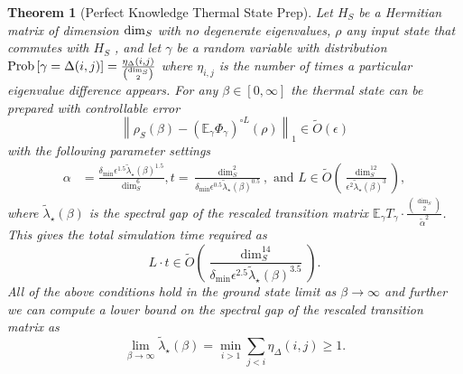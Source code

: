 \documentclass[
 amsmath,amssymb,
 aps,
onecolumn, 
nofootinbib]{revtex4-2}
\newtheorem{theorem}{Theorem}
\newcommand{\norm}[1]{\left\| #1 \right\|}
\newcommand{\EE}{\mathbb{E}}
\newcommand{\prob}[1]{{\rm Prob}\left[ #1 \right]}
\newcommand{\bigotilde}[1]{\widetilde{O} \left( #1 \right)}
\begin{document}
\begin{theorem}[Perfect Knowledge Thermal State Prep] \label{thm:perfect_knowledge}
    Let $H_S$ be a Hermitian matrix of dimension ${\rm dim}_S$ with no degenerate eigenvalues, $\rho$ any input state that commutes with $H_S$ , and let $\gamma$ be a random variable with distribution $\prob{\gamma = \Delta(i,j)} = \frac{\eta_\Delta(i,j)}{\binom{\dim_S}{2}}$ where $\eta_{i,j}$ is the number of times a particular eigenvalue difference appears. For any $\beta\in [0,\infty]$ the thermal state can be prepared with controllable error
    \begin{equation}
        \norm{\rho_S(\beta) - \left(\EE_\gamma \Phi_\gamma \right)^{\circ L}(\rho)}_1 \in \bigotilde{\epsilon}
    \end{equation}
     with the following parameter settings
     \begin{align}
         \alpha &= \frac{\delta_{\min} \epsilon^{1.5} \widetilde{\lambda}_\star(\beta)^{1.5}}{\dim_S^6}, t = \frac{\dim_S^2}{\delta_{\min} \epsilon^{0.5} \widetilde{\lambda}_\star(\beta)^{0.5}},\text{ and } L \in \bigotilde{\frac{\dim_S^{12}}{\epsilon^2 \widetilde{\lambda}_\star(\beta)^3}},
     \end{align}
     where $\widetilde{\lambda}_\star(\beta)$ is the spectral gap of the rescaled transition matrix $\EE_\gamma T_\gamma  \cdot \frac{\binom{\dim_S}{2}}{\widetilde{\alpha}^2}$. 
     This gives the total simulation time required as
     \begin{equation}
         L \cdot t \in \bigotilde{\frac{\dim_S^{14}}{\delta_{\min} \epsilon^{2.5} \widetilde{\lambda}_\star(\beta)^{3.5}}}.
     \end{equation}
     All of the above conditions hold in the ground state limit as $\beta \to \infty$ and further we can compute a lower bound on the spectral gap of the rescaled transition matrix as
     \begin{equation}
         \lim_{\beta \to \infty} \widetilde{\lambda}_\star(\beta) = \min_{i > 1} \sum_{j < i} \eta_\Delta(i,j) \ge 1.
     \end{equation}
\end{theorem}
\end{document}

